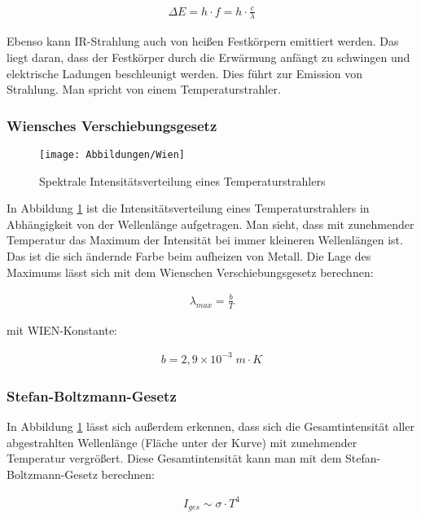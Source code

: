 \documentclass[a4paper]{scrartcl}
\numberwithin{equation}{subsection}
\begin{document}
\begin{align}
\Delta E = h \cdot f = h \cdot \frac{c}{\lambda}
\end{align}

Ebenso kann IR-Strahlung auch von heißen Festkörpern emittiert werden.
Das liegt daran, dass der Festkörper durch die Erwärmung anfängt zu schwingen und elektrische Ladungen beschleunigt werden.
Dies führt zur Emission von Strahlung.
Man spricht von einem Temperaturstrahler.

\subsubsection{Wiensches Verschiebungsgesetz}

\begin{figure}[H]
\texttt{[image: Abbildungen/Wien]}
\centering
\caption{Spektrale Intensitätsverteilung eines Temperaturstrahlers \cite{anl}}
\centering
\label{fig:wien}
\end{figure}

In Abbildung \ref{fig:wien} ist die Intensitätsverteilung eines Temperaturstrahlers in Abhängigkeit von der Wellenlänge aufgetragen.
Man sieht, dass mit zunehmender Temperatur das Maximum der Intensität bei immer kleineren Wellenlängen ist.
Das ist die sich ändernde Farbe beim aufheizen von Metall.
Die Lage des Maximums lässt sich mit dem Wienschen Verschiebungsgesetz berechnen:

\begin{align}
\label{eq:wien}
\lambda_{max} = \frac{b}{T}
\end{align}

mit WIEN-Konstante:

\begin{align*}
b = 2,9 \times 10^{-3}\;m \cdot K
\end{align*}

\subsubsection{Stefan-Boltzmann-Gesetz}
In Abbildung \ref{fig:wien} lässt sich außerdem erkennen, dass sich die Gesamtintensität aller abgestrahlten Wellenlänge (Fläche unter der Kurve) mit zunehmender Temperatur vergrößert.
Diese Gesamtintensität kann man mit dem Stefan-Boltzmann-Gesetz berechnen:

\begin{align}
\label{eq:StBo}
I_{ges} \sim \sigma \cdot T^4
\end{align}
\end{document}

